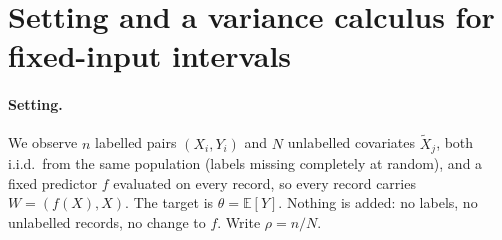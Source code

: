 \section{Setting and a variance calculus for fixed-input intervals}
\label{sec:theory}

\paragraph{Setting.}
We observe $n$ labelled pairs $(X_i,Y_i)$ and $N$ unlabelled covariates $\tilde X_j$, both i.i.d.\ from the
same population (labels missing completely at random), and a fixed predictor $f$ evaluated on every record, so
every record carries $W=(f(X),X)$. The target is $\theta=\mathbb E[Y]$.
Nothing is added: no labels, no unlabelled records, no change to $f$. Write $\rho=n/N$.


